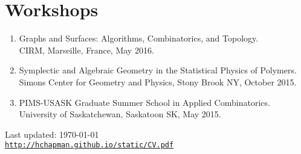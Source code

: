 \documentclass[letterpaper]{article}
\def\footerlink{http://hchapman.github.io/static/CV.pdf}
\begin{document}
\section*{Workshops}
\begin{enumerate}
\item Graphs and Surfaces: Algorithms, Combinatorics, and Topology. \\
  CIRM, Marseille, France, May 2016.
\item Symplectic and Algebraic Geometry in the Statistical Physics of Polymers. \\
  Simons Center for Geometry and Physics, Stony Brook NY, October 2015. 
\item PIMS-USASK Graduate Summer School in Applied Combinatorics. \\
  University of Saskatchewan, Saskatoon SK, May 2015.
\end{enumerate}

\bigskip

\begin{center}
  \begin{footnotesize}
    Last updated: \today \\
    \href{\footerlink}{\texttt{\footerlink}}
  \end{footnotesize}
\end{center}
\end{document}
